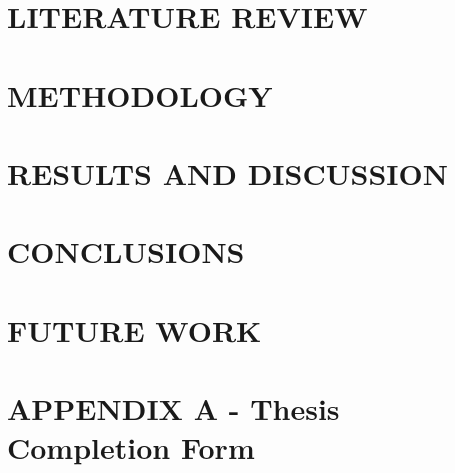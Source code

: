\documentclass[12pt,twoside]{article}
\begin{document}
\section{LITERATURE REVIEW}

\cleardoublepage

\section{METHODOLOGY}

\cleardoublepage

\section{RESULTS AND DISCUSSION}

\cleardoublepage

\section{CONCLUSIONS}
\cleardoublepage

\section{FUTURE WORK}

\cleardoublepage

\printbibliography[title={REFERENCES},heading=bibnumbered]
\cleardoublepage

\appendix
\section*{APPENDIX A - Thesis Completion Form}
\cleardoublepage

\end{document}
